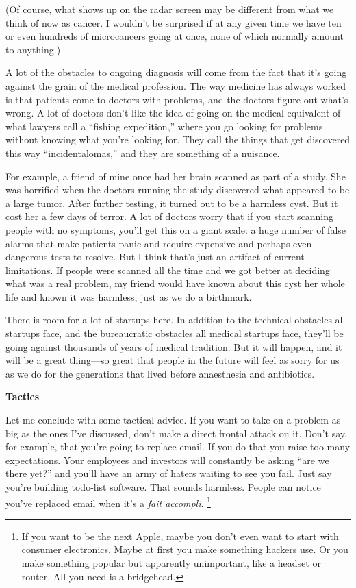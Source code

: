 \documentclass[12pt]{book}
\begin{document}
(Of course, what shows up on the radar screen may be different from what
we think of now as cancer. I wouldn't be surprised if at any given time
we have ten or even hundreds of microcancers going at once, none of
which normally amount to anything.)

A lot of the obstacles to ongoing diagnosis will come from the fact that
it's going against the grain of the medical profession. The way medicine
has always worked is that patients come to doctors with problems, and
the doctors figure out what's wrong. A lot of doctors don't like the
idea of going on the medical equivalent of what lawyers call a ``fishing
expedition,'' where you go looking for problems without knowing what
you're looking for. They call the things that get discovered this way
``incidentalomas,'' and they are something of a nuisance.

For example, a friend of mine once had her brain scanned as part of a
study. She was horrified when the doctors running the study discovered
what appeared to be a large tumor. After further testing, it turned out
to be a harmless cyst. But it cost her a few days of terror. A lot of
doctors worry that if you start scanning people with no symptoms, you'll
get this on a giant scale: a huge number of false alarms that make
patients panic and require expensive and perhaps even dangerous tests to
resolve. But I think that's just an artifact of current limitations. If
people were scanned all the time and we got better at deciding what was
a real problem, my friend would have known about this cyst her whole
life and known it was harmless, just as we do a birthmark.

There is room for a lot of startups here. In addition to the technical
obstacles all startups face, and the bureaucratic obstacles all medical
startups face, they'll be going against thousands of years of medical
tradition. But it will happen, and it will be a great thing---so great
that people in the future will feel as sorry for us as we do for the
generations that lived before anaesthesia and antibiotics.

\textbf{Tactics}

Let me conclude with some tactical advice. If you want to take on a
problem as big as the ones I've discussed, don't make a direct frontal
attack on it. Don't say, for example, that you're going to replace
email. If you do that you raise too many expectations. Your employees
and investors will constantly be asking ``are we there yet?'' and you'll
have an army of haters waiting to see you fail. Just say you're building
todo-list software. That sounds harmless. People can notice you've
replaced email when it's a \emph{fait accompli}. \footnote{If you want to be the next Apple, maybe you don't even want to
start with consumer electronics. Maybe at first you make something
hackers use. Or you make something popular but apparently unimportant,
like a headset or router. All you need is a bridgehead.}
\end{document}
